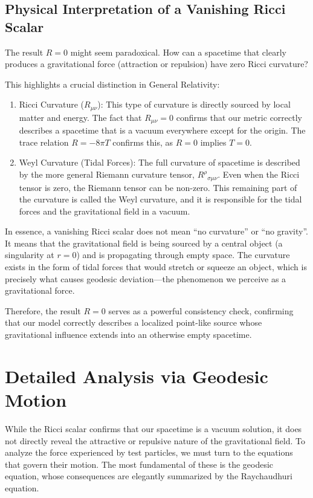 \documentclass[%
  reprint,
  superscriptaddress,
  showpacs,
  showkeys,
  amsmath,amssymb,
  pra,
  longbibliography,
  floatfix,
]{revtex4-2}
\begin{document}
\subsection{Physical Interpretation of a Vanishing Ricci Scalar}

The result $R=0$ might seem paradoxical. How can a spacetime that clearly produces a gravitational force (attraction or repulsion) have zero Ricci curvature?

This highlights a crucial distinction in General Relativity:
\begin{enumerate}
    \item {Ricci Curvature ($R_{\mu\nu}$):} This type of curvature is directly sourced by local matter and energy. The fact that $R_{\mu\nu}=0$ confirms that our metric correctly describes a spacetime that is a {vacuum} everywhere except for the origin. The trace relation $R = -8\pi T$ confirms this, as $R=0$ implies $T=0$.

    \item {Weyl Curvature (Tidal Forces):} The full curvature of spacetime is described by the more general Riemann curvature tensor, $R^\rho{}_{\sigma\mu\nu}$. Even when the Ricci tensor is zero, the Riemann tensor can be non-zero. This remaining part of the curvature is called the Weyl curvature, and it is responsible for the tidal forces and the gravitational field in a vacuum.
\end{enumerate}

In essence, a vanishing Ricci scalar does not mean ``no curvature'' or ``no gravity''. It means that the gravitational field is being sourced by a central object (a singularity at $r=0$) and is propagating through empty space. The curvature exists in the form of tidal forces that would stretch or squeeze an object, which is precisely what causes geodesic deviation---the phenomenon we perceive as a gravitational force.

Therefore, the result $R=0$ serves as a powerful consistency check, confirming that our model correctly describes a localized point-like source whose gravitational influence extends into an otherwise empty spacetime.

\section{Detailed Analysis via Geodesic Motion}
\label{sec:geodesic}

While the Ricci scalar confirms that our spacetime is a vacuum solution, it does not directly reveal the attractive or repulsive nature of the gravitational field. To analyze the force experienced by test particles, we must turn to the equations that govern their motion. The most fundamental of these is the geodesic equation, whose consequences are elegantly summarized by the Raychaudhuri equation.
\end{document}
